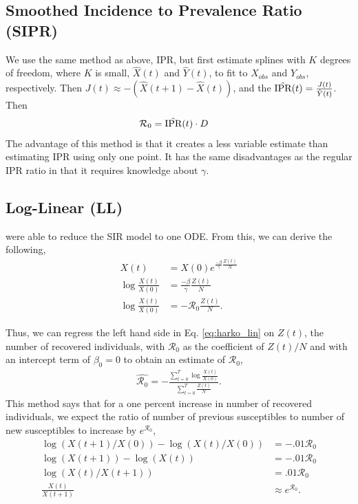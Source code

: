 \documentclass[12pt]{article}
\newcommand{\rr}{\ensuremath{\mathcal{R}_0}}
\begin{document}
\subsection{Smoothed Incidence to Prevalence Ratio (SIPR)}
We use the same method as above, IPR, but first estimate splines with $K$ degrees of freedom, where $K$ is small, $\hat{X}(t)$ and $\hat{Y}(t)$, to fit to $X_{obs}$ and $Y_{obs}$, respectively.  Then  $J(t) \approx -(\hat{X}(t+1) - \hat{X}(t))$, and the $\hat{\textnormal{IPR}}(t) = \frac{J(t)}{\hat{Y}(t)}$.  Then
\begin{align*}
\rr &= \hat{\textnormal{IPR}}(t) \cdot D
\end{align*}
The advantage of this method is that it creates a less variable estimate than estimating IPR using only one point.  It has the same disadvantages as the regular IPR ratio in that it requires knowledge about $\gamma$.

\subsection{Log-Linear (LL)}
\cite{harko2014exact} were able to reduce the SIR model to one ODE.  From this, we can derive the following,
\begin{align}
  X(t) &=  X(0) e^{\frac{-\beta}{\gamma}\frac{Z(t)}{N}} \nonumber\\
  \log \frac{X(t)}{X(0)} &=  \frac{-\beta }{\gamma}\frac{Z(t)}{N} \nonumber\\
  \log \frac{X(t)}{X(0)} &=  -\rr \frac{Z(t)}{N}. \label{eq:harko_lin}
\end{align}

Thus, we can regress the left hand side in Eq. \ref{eq:harko_lin} on $Z(t)$, the number of recovered individuals, with $\rr$ as the coefficient of $Z(t)/N$ and with an intercept term of $\beta_0=0$ to obtain an estimate of $\rr$,
\begin{align*}
  \hat{\rr} = -\frac{\sum_{t=0}^T \log \frac{ X(t)}{X(0)}}{\sum_{t=0}^T\frac{Z(t)}{N}}.
\end{align*}
This method says that for a one percent increase in number of recovered individuals, we expect the ratio of number of previous susceptibles to number of new susceptibles to increase by $e^{\rr}$,
\begin{align*}
  \log \left ( X(t+1)/ X(0) \right ) - \log \left ( X(t)/X(0) \right ) &= - .01\rr\\
  \log \left ( X(t+1) \right ) - \log \left ( X(t) \right )  &=- .01\rr\\
  \log \left ( X(t) / X(t+1) \right ) &= .01\rr\\
  \frac{X(t)}{X(t+1)}  &\approx e^{\rr}.
\end{align*}
\end{document}
